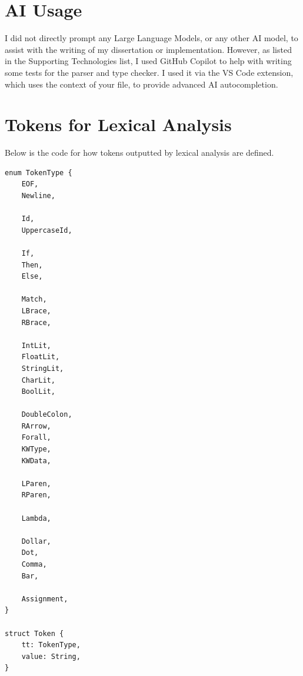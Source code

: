 
\appendix

\chapter{AI Usage}
\label{appx:ai_prompt}

I did not directly prompt any Large Language Models, or any other AI model, to assist with the writing of my dissertation or implementation. However, as listed in the Supporting Technologies list, I used GitHub Copilot to help with writing some tests for the parser and type checker. I used it via the VS Code extension, which uses the context of your file, to provide advanced AI autocompletion.


\chapter{Tokens for Lexical Analysis}
\label{appx:tokens}
Below is the code for how tokens outputted by lexical analysis are defined. 
\begin{lstlisting}
enum TokenType {
    EOF,
    Newline,

    Id,
    UppercaseId,

    If,
    Then,
    Else,

    Match,
    LBrace,
    RBrace,

    IntLit,
    FloatLit,
    StringLit,
    CharLit,
    BoolLit,

    DoubleColon,
    RArrow,
    Forall,
    KWType,
    KWData,

    LParen,
    RParen,

    Lambda,

    Dollar,
    Dot,
    Comma,
    Bar,

    Assignment,
}

struct Token {
    tt: TokenType,
    value: String,
}
\end{lstlisting}

